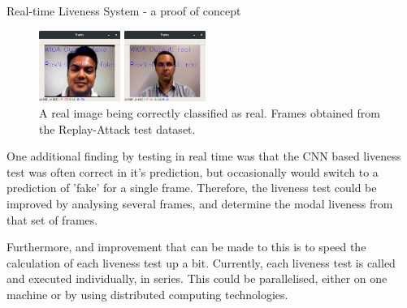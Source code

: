 \documentclass[final]{beamer}
\begin{document}
\begin{frame}{}
\begin{columns}[t]
\begin{column}{.48\linewidth}
\begin{block}{Real-time Liveness System - a proof of concept}
          \begin{figure}[!tbp]
            \centering
            \begin{minipage}[b]{0.3\textwidth}
              \centering
              \includegraphics[width=100px]{FakeOutputAndCorrect.png}
              \caption{A spoofed image being correctly classified as fake by both liveness tests. Frames obtained from the Replay-Attack test dataset.}
            \end{minipage}
            \begin{minipage}[b]{0.3\textwidth}
              \centering
              \includegraphics[width=100px]{BothRealAndCorrect.png}
            \caption{A real image being correctly classified as real. Frames obtained from the Replay-Attack test dataset.}
            \end{minipage}
          \end{figure}
          
          One additional finding by testing in real time was that the CNN based liveness test was often correct in it's prediction, but occasionally would
          switch to a prediction of 'fake' for a single frame. Therefore, the liveness test could be improved by analysing several frames, and determine the modal liveness from that set of frames.
          
          Furthermore, and improvement that can be made to this is to speed the calculation of each liveness test up a bit. Currently, each liveness test is called and executed individually, in series. This could be parallelised,
          either on one machine or by using distributed computing technologies.
        \end{block}
      \end{column}
    \end{columns}


\end{frame}
\end{document}
